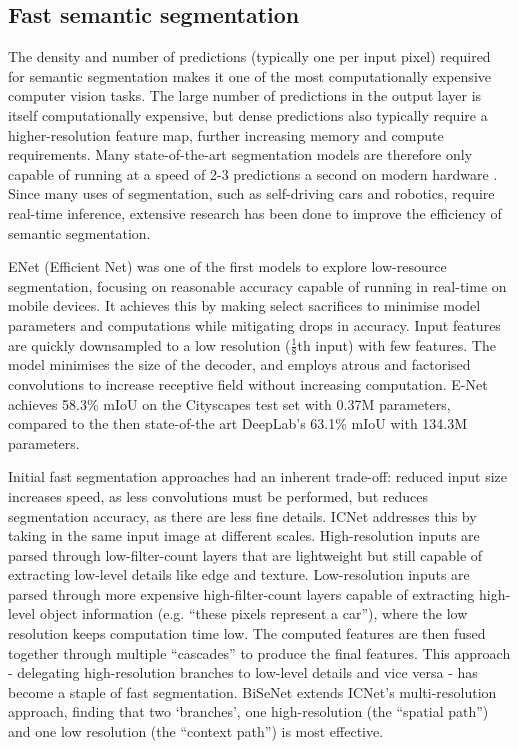 \documentclass[a4paper,12pt]{report}
\begin{document}
\subsection{Fast semantic segmentation}
The density and number of predictions (typically one per input pixel) required for semantic segmentation makes it one of the most computationally expensive computer vision tasks. The large number of predictions in the output layer is itself computationally expensive, but dense predictions also typically require a higher-resolution feature map, further increasing memory and compute requirements. Many state-of-the-art segmentation models are therefore only capable of running at a speed of 2-3 predictions a second on modern hardware \cite{zhao_icnet_2018}. Since many uses of segmentation, such as self-driving cars and robotics, require  real-time inference, extensive research has been done to improve the efficiency of semantic segmentation.

ENet (Efficient Net) \cite{paszke_enet_2016} was one of the first models to explore low-resource segmentation, focusing on reasonable accuracy capable of running in real-time on mobile devices. It achieves this by making select sacrifices to minimise model parameters and computations while mitigating drops in accuracy. Input features are quickly downsampled to a low resolution ($\frac{1}{8}$th input) with few features. The model minimises the size of the decoder, and employs atrous and factorised convolutions to increase receptive field without increasing computation. E-Net achieves 58.3\% mIoU on the Cityscapes test set with 0.37M parameters, compared to the then state-of-the art DeepLab’s 63.1\% mIoU with 134.3M parameters.

Initial fast segmentation approaches had an inherent trade-off: reduced input size increases speed, as less convolutions must be performed, but reduces segmentation accuracy, as there are less fine details. ICNet \cite{zhao_icnet_2018} addresses this by taking in the same input image at different scales. High-resolution inputs are parsed through low-filter-count layers that are lightweight but still capable of extracting low-level details like edge and texture. Low-resolution inputs are parsed through more expensive high-filter-count layers capable of extracting high-level object information (e.g. “these pixels represent a car”), where the low resolution keeps computation time low. The computed features are then fused together through multiple “cascades” to produce the final features. This approach - delegating high-resolution branches to low-level details and vice versa - has become a staple of fast segmentation. BiSeNet \cite{yu_bisenet_2018} extends ICNet’s multi-resolution approach, finding that two ‘branches’, one high-resolution (the “spatial path”) and one low resolution (the “context path”) is most effective.
\end{document}

